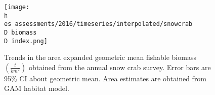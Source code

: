 \documentclass[11pt]{article}
\newcommand{\D}{.}
\newcommand{\h}{\string~/}
\newcommand{\es}{bio.data/bio.snowcrab/}
\begin{document}



\begin{figure}
\centering
\texttt{[image: \\h \\es assessments/2016/timeseries/interpolated/snowcrab\\D biomass\\D index.png]}\\ 
\caption{Trends in the area expanded geometric mean fishable biomass $\left(\tfrac{t}{km^2}\right)$ obtained from the annual snow crab survey. Error bars are 95\% CI about geometric mean. Area estimates are obtained from GAM habitat model.}
\end{figure} %
\clearpage





\end{document}
